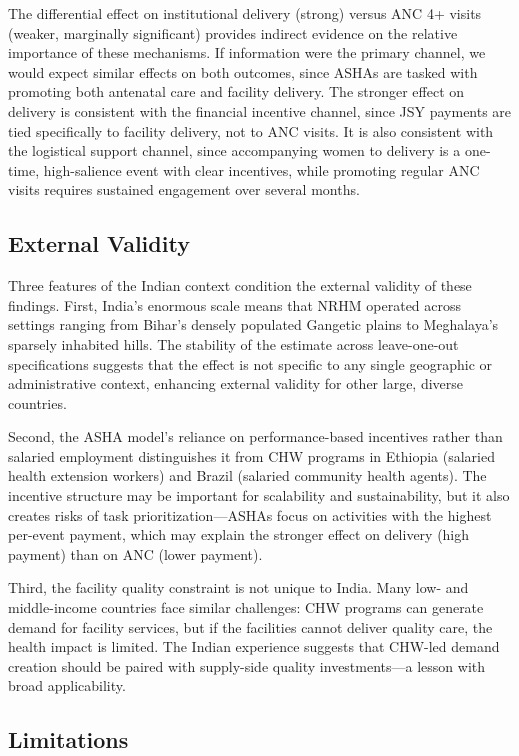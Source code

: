 \documentclass[12pt]{article}
\begin{document}
The differential effect on institutional delivery (strong) versus ANC 4+ visits (weaker, marginally significant) provides indirect evidence on the relative importance of these mechanisms. If information were the primary channel, we would expect similar effects on both outcomes, since ASHAs are tasked with promoting both antenatal care and facility delivery. The stronger effect on delivery is consistent with the financial incentive channel, since JSY payments are tied specifically to facility delivery, not to ANC visits. It is also consistent with the logistical support channel, since accompanying women to delivery is a one-time, high-salience event with clear incentives, while promoting regular ANC visits requires sustained engagement over several months.

\subsection{External Validity}

Three features of the Indian context condition the external validity of these findings. First, India's enormous scale means that NRHM operated across settings ranging from Bihar's densely populated Gangetic plains to Meghalaya's sparsely inhabited hills. The stability of the estimate across leave-one-out specifications suggests that the effect is not specific to any single geographic or administrative context, enhancing external validity for other large, diverse countries.

Second, the ASHA model's reliance on performance-based incentives rather than salaried employment distinguishes it from CHW programs in Ethiopia (salaried health extension workers) and Brazil (salaried community health agents). The incentive structure may be important for scalability and sustainability, but it also creates risks of task prioritization---ASHAs focus on activities with the highest per-event payment, which may explain the stronger effect on delivery (high payment) than on ANC (lower payment).

Third, the facility quality constraint is not unique to India. Many low- and middle-income countries face similar challenges: CHW programs can generate demand for facility services, but if the facilities cannot deliver quality care, the health impact is limited. The Indian experience suggests that CHW-led demand creation should be paired with supply-side quality investments---a lesson with broad applicability.

\subsection{Limitations}
\end{document}
